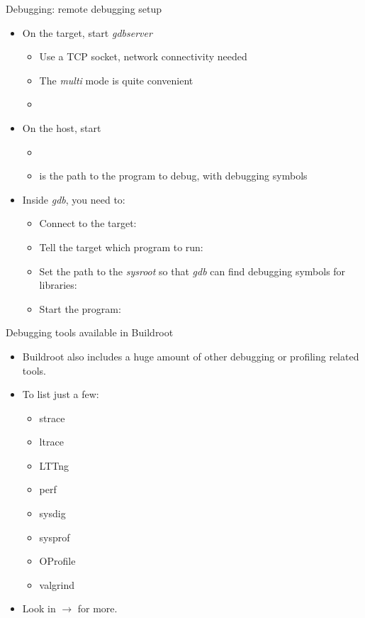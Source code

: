 \begin{frame}{Debugging: remote debugging setup}
  \begin{itemize}
  \item On the target, start {\em gdbserver}
    \begin{itemize}
    \item Use a TCP socket, network connectivity needed
    \item The {\em multi} mode is quite convenient
    \item {}
    \end{itemize}
  \item On the host, start 
    \begin{itemize}
    \item {}
    \item {} is the path to the program to debug, with
      debugging symbols
    \end{itemize}
  \item Inside {\em gdb}, you need to:
    \begin{itemize}
    \item Connect to the target:\\
    \item Tell the target which program to run:\\
    \item Set the path to the {\em sysroot} so that {\em gdb} can find debugging symbols for libraries:\\
    \item Start the program:\\
    \end{itemize}
  \end{itemize}
\end{frame}

\begin{frame}{Debugging tools available in Buildroot}
  \begin{itemize}
  \item Buildroot also includes a huge amount of other debugging or
    profiling related tools.
  \item To list just a few:
    \begin{itemize}
    \item strace
    \item ltrace
    \item LTTng
    \item perf
    \item sysdig
    \item sysprof
    \item OProfile
    \item valgrind
    \end{itemize}
  \item Look in  $\rightarrow$  for more.
  \end{itemize}
\end{frame}

